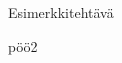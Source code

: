 \begin{tehtavasivu}

\begin{tehtava}
Esimerkkitehtävä
	\begin{vastaus}
	pöö2
	\end{vastaus}
\end{tehtava}

  
\end{tehtavasivu} 